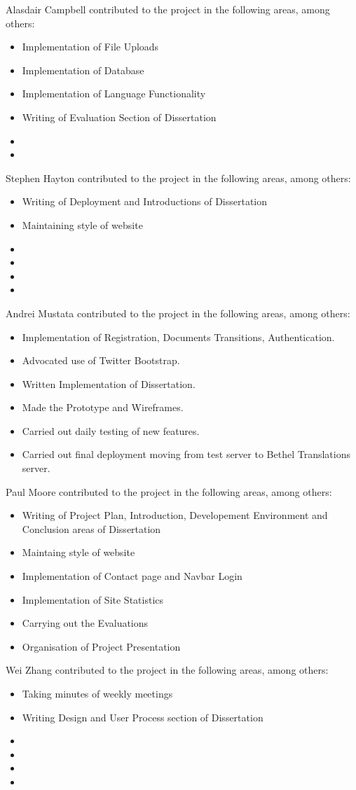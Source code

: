 \documentclass{l3proj}
\begin{document}
Alasdair Campbell contributed to the project in the following areas, among others:
\begin{itemize}
\item{Implementation of File Uploads}
\item{Implementation of Database}
\item{Implementation of Language Functionality}
\item{Writing of Evaluation Section of Dissertation}
\item{}
\item{}
\end{itemize}
Stephen Hayton contributed to the project in the following areas, among others:
\begin{itemize}
\item{Writing of Deployment and Introductions of Dissertation}
\item{Maintaining style of website}
\item{}
\item{}
\item{}
\item{}
\end{itemize}
Andrei Mustata contributed to the project in the following areas, among others:
\begin{itemize}
\item{Implementation of Registration, Documents Transitions, Authentication.}
\item{Advocated use of Twitter Bootstrap.}
\item{Written Implementation of Dissertation.}
\item{Made the Prototype and Wireframes.}
\item{Carried out daily testing of new features.}
\item{Carried out final deployment moving from test server to Bethel Translations server.}
\end{itemize}
Paul Moore contributed to the project in the following areas, among others:
\begin{itemize}
\item{Writing of Project Plan, Introduction, Developement Environment and Conclusion areas of Dissertation}
\item{Maintaing style of website}
\item{Implementation of Contact page and Navbar Login}
\item{Implementation of Site Statistics}
\item{Carrying out the Evaluations}
\item{Organisation of Project Presentation}
\end{itemize}
Wei Zhang contributed to the project in the following areas, among others:
\begin{itemize}
\item{Taking minutes of weekly meetings}
\item{Writing Design and User Process section of Dissertation}
\item{}
\item{}
\item{}
\item{}
\end{itemize}	
\end{document}

